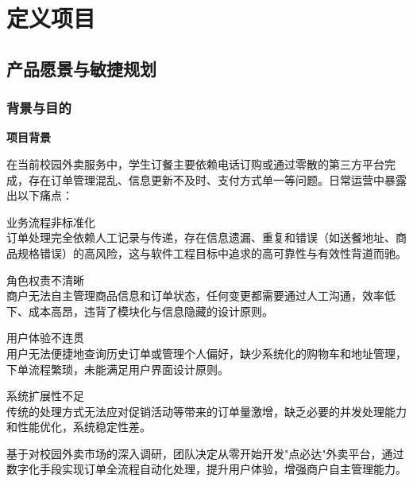 \chapter{定义项目}

\section{产品愿景与敏捷规划}

\subsection{背景与目的}

\begin{levellist}
    \item \textbf{项目背景} \par
    \hspace{1.6em} 在当前校园外卖服务中，学生订餐主要依赖电话订购或通过零散的第三方平台完成，存在订单管理混乱、信息更新不及时、支付方式单一等问题。日常运营中暴露出以下痛点：
    \begin{levellist}
        \item 业务流程非标准化 \\
        订单处理完全依赖人工记录与传递，存在信息遗漏、重复和错误（如送餐地址、商品规格错误）的高风险，这与软件工程目标中追求的高可靠性与有效性背道而驰。
        \item 角色权责不清晰 \\
        商户无法自主管理商品信息和订单状态，任何变更都需要通过人工沟通，效率低下、成本高昂，违背了模块化与信息隐藏的设计原则。
        \item 用户体验不连贯 \\
        用户无法便捷地查询历史订单或管理个人偏好，缺少系统化的购物车和地址管理，下单流程繁琐，未能满足用户界面设计原则。
        \item 系统扩展性不足 \\
        传统的处理方式无法应对促销活动等带来的订单量激增，缺乏必要的并发处理能力和性能优化，系统稳定性差。
    \end{levellist}

    \hspace{1.6em} 基于对校园外卖市场的深入调研，团队决定从零开始开发"点必达"外卖平台，通过数字化手段实现订单全流程自动化处理，提升用户体验，增强商户自主管理能力。



\end{levellist}
